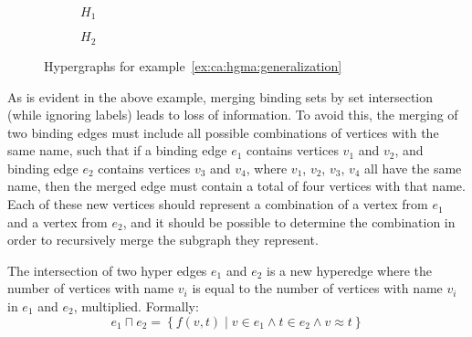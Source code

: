 \documentclass[../Master.tex]{subfiles}
\providecommand{\master}{..}
\begin{document}
\begin{example}
    \begin{figure} \label{fig:ex:ca:hgma:ex:generalization}
        \centering
        \begin{subfigure}[b]{0.4\textwidth}
            \centering
            \resizebox{\linewidth}{!}{}
			\caption{$H_1$}
            \label{fig:ex:ca:hgma:ex:generalization1}
        \end{subfigure}%
        \hfill%
        \begin{subfigure}[b]{0.4\textwidth}
            \centering
            \resizebox{0.8\linewidth}{!}{}
            \caption{$H_2$}
            \label{fig:ex:ca:hgma:ex:generalization2}
        \end{subfigure}
		\caption{Hypergraphs for example~\ref{ex:ca:hgma:generalization}}
    \end{figure}

\end{example}

As is evident in the above example, merging binding sets by set intersection (while ignoring labels) leads to loss of information. To avoid this, the merging of two binding edges must include all possible combinations of vertices with the same name, such that if a binding edge $e_1$ contains vertices $v_1$ and $v_2$, and binding edge $e_2$ contains vertices $v_3$ and $v_4$, where $v_1$, $v_2$, $v_3$, $v_4$ all have the same name, then the merged edge must contain a total of four vertices with that name. Each of these new vertices should represent a combination of a vertex from $e_1$ and a vertex from $e_2$, and it should be possible to determine the combination in order to recursively merge the subgraph they represent.

\begin{definition}
    The intersection of two hyper edges $e_1$ and $e_2$ is a new hyperedge where the number of vertices with name $v_i$ is equal to the number of vertices with name $v_i$ in $e_1$ and $e_2$, multiplied. Formally:
    \begin{equation*}
        e_1 \sqcap e_2 = \left\{
            f(v, t) \; | \;
                v \in e_1 \land t \in e_2 \land v \approx t
        \right\}
    \end{equation*}

\end{definition}
\end{document}
